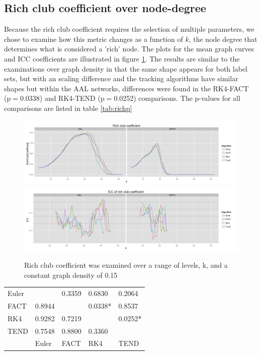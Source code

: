 \documentclass{frontiersSCNS} %
\begin{document}
\subsection{Rich club coefficient over node-degree}
Because the rich club coefficient requires the selection of multiple parameters, we chose to examine how this metric
changes as a function of $k$, the node degree that determines what is considered a 'rich' node. The plots for the
mean graph curves and ICC coefficients are illustrated in figure \ref{fig:richclub}. The results are similar to the examinations
over graph density in that the same shape appears for both label sets, but with an scaling difference and the tracking algorithms
have similar shapes but within the AAL networks, differences were found in the RK4-FACT (p$=$0.0338) and RK4-TEND (p$=$0.0252) 
comparisons. The p-values for all comparisons are listed in table \ref{tab:richp}

\begin{figure}
\begin{center}
\includegraphics[width=0.5\linewidth]{figures/richclub_plot.png} \\
\includegraphics[width=0.5\linewidth]{figures/richclub_icc_plot.png}
\caption{Rich club coefficient was examined over a range of levels, k, and a constant graph density of 0.15}
\label{fig:richclub}
\end{center}
\end{figure}

\begin{table}[!t]
{
\begin{tabular}{l | llll }
\midrule
Euler  &            & 0.3359  & 0.6830    & 0.2064   \\
FACT & 0.8944 &              & 0.0338*  & 0.8537     \\
RK4   & 0.9282 & 0.7219   &               & 0.0252*   \\
TEND & 0.7548 & 0.8800  & 0.3360    &                \\             
\midrule
         & Euler    & FACT     & RK4        & TEND        \\
\midrule
\end{tabular}}{}
\end{table}
\end{document}
